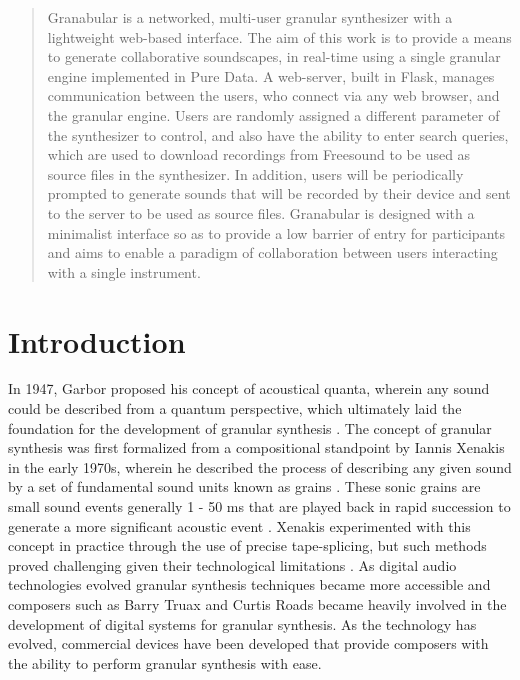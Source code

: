 \documentclass{nime-alternate}
\begin{document}
\begin{abstract}

Granabular is a networked, multi-user granular synthesizer with a lightweight web-based interface. 
The aim of this work is to provide a means to generate collaborative soundscapes, 
in real-time using a single granular engine implemented in Pure Data. A web-server, 
built in Flask, manages communication between the users, who connect via any web browser, and the granular engine. 
Users are randomly assigned a different parameter of the synthesizer to control, 
and also have the ability to enter search queries, which are used to download recordings 
from Freesound to be used as source files in the synthesizer. 
In addition, users will be periodically prompted to generate sounds that will be recorded 
by their device and sent to the server to be used as source files. Granabular is designed with a minimalist 
interface so as to provide a low barrier of entry for participants and aims to enable a paradigm of 
collaboration between users interacting with a single instrument. 

\end{abstract}


\section{Introduction}
In 1947, Garbor proposed his concept of acoustical quanta, wherein any sound could be described from a quantum perspective, 
which ultimately laid the foundation for the development of granular synthesis \cite{gabor1947acoustical}. 
The concept of granular synthesis was first formalized from a compositional standpoint by Iannis Xenakis in the early 1970s, 
wherein he described the process of describing any given sound by a set of fundamental sound units known as grains \cite{xenakis1992formalized}. 
These sonic grains are small sound events generally 1 - 50 ms that are played back in rapid succession to generate a more significant acoustic event \cite{roads1988granular}. 
Xenakis experimented with this concept in practice through the use of precise tape-splicing, 
but such methods proved challenging given their technological limitations \cite{roads1996computer}. 
As digital audio technologies evolved granular synthesis techniques became more accessible and composers 
such as Barry Truax \cite{truax1988real} and Curtis Roads \cite{roads1988granular} became heavily involved 
in the development of digital systems for granular synthesis. As the technology has evolved, 
commercial devices have been developed that provide composers with the ability to perform granular synthesis with ease. 
\end{document}
